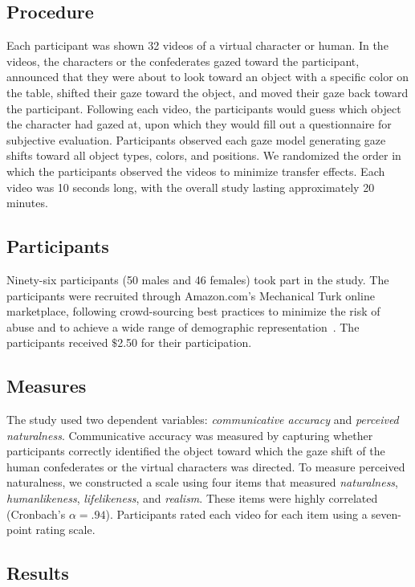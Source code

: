 \subsection{Procedure}

Each participant was shown 32 videos of a virtual character or human. In the videos, the characters or the confederates gazed toward the participant, announced that they were about to look toward an object with a specific color on the table, shifted their gaze toward the object, and moved their gaze back toward the participant. Following each video, the participants would guess which object the character had gazed at, upon which they would fill out a questionnaire for subjective evaluation. Participants observed each gaze model generating gaze shifts toward all object types, colors, and positions. We randomized the order in which the participants observed the videos to minimize transfer effects. Each video was 10 seconds long, with the overall study lasting approximately 20 minutes.

\subsection{Participants}

Ninety-six participants (50 males and 46 females) took part in the study. The participants were recruited through Amazon.com's Mechanical Turk online marketplace, following crowd-sourcing best practices to minimize the risk of abuse and to achieve a wide range of demographic representation~\citep{kittur2008crowdsourcing}. The participants received $\$$2.50 for their participation.

\subsection{Measures}

The study used two dependent variables: \emph{communicative accuracy} and \emph{perceived naturalness}. Communicative accuracy was measured by capturing whether participants correctly identified the object toward which the gaze shift of the human confederates or the virtual characters was directed. To measure perceived naturalness, we constructed a scale using four items that measured \emph{naturalness}, \emph{humanlikeness}, \emph{lifelikeness}, and \emph{realism}. These items were highly correlated (Cronbach's $\alpha = .94$). Participants rated each video for each item using a seven-point rating scale.

\subsection{Results}

